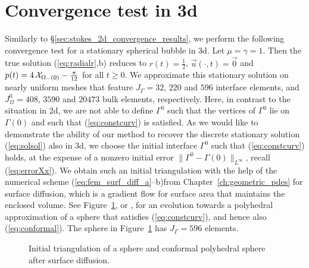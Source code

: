 \section{Convergence test in 3d}\label{sec:stokes_3d_convergence_results}
Similarly to \S\ref{sec:stokes_2d_convergence_results}, we perform the following
convergence test for a stationary spherical bubble in 3d. Let $\mu = \gamma =
1$. Then the true solution (\ref{eq:radialr},b) reduces to $r(t) =
\frac{1}{2}$, $\vec u(\cdot, t) = \vec 0$ and $p(t) = 4\,\mathrm{\mathcal{X}}_{\Omega_-(0)}
- \frac{\pi}{12}$ for all $t\geq0$. We approximate this stationary solution on
nearly uniform meshes that feature $J_\Gamma = 32$, $220$ and $596$ interface
elements, and $J_\Omega^0 = 408$, $3590$ and $20473$ bulk elements,
respectively. Here, in contrast to the situation in 2d, we are not able to
define $\Gamma^0$ such that the vertices of $\Gamma^0$ lie on $\Gamma(0)$ and
such that (\ref{eq:constcurv}) is satisfied. As we would like to demonstrate
the ability of our method to recover the discrete stationary solution
(\ref{eq:solsol}) also in 3d, we choose the initial interface $\Gamma^0$ such
that (\ref{eq:constcurv}) holds, at the expense of a nonzero initial error
$\| \Gamma^0 - \Gamma(0) \|_{L^\infty}$, recall (\ref{eq:errorXx}). We obtain
such an initial triangulation with the help of the numerical scheme
(\ref{eq:fem_surf_diff_a}--b)from Chapter~\ref{ch:geometric_pdes} for surface
diffusion, which is a gradient flow for surface area that maintains the
enclosed volume. See Figure~\ref{fig:conformal_sphere}, or
\cite[Fig. 11]{gflows3d}, for an evolution towards a polyhedral approximation
of a sphere that satisfies (\ref{eq:constcurv}), and hence also
(\ref{eq:conformal}). The sphere in Figure~\ref{fig:conformal_sphere} has
$J_\Gamma = 596$ elements.
\begin{figure}[htbp]
\centering
{}
\caption[Conformal polyhedral sphere triangulation]{Initial triangulation of
a sphere and conformal polyhedral sphere after surface diffusion.}
\label{fig:conformal_sphere}
\end{figure}

